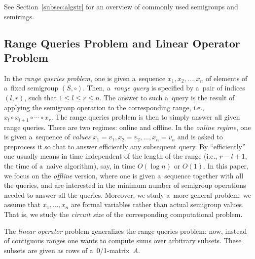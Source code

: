 \documentclass{toc}
\begin{document}
See Section~\ref{subsec:algstr} for an overview of commonly used semigroups and
semirings.



\subsection{Range Queries Problem and Linear Operator Problem}
In the {\em range queries problem}, one is given
a~sequence $x_1, x_2, \dotsc, x_n$ of
elements of a~fixed semigroup $(S, \circ)$.
Then, a~\emph{range query} is
specified by a~pair of indices $(l,r)$, such that $1 \le l \le r \le n$.
The answer to such a~query is the result of applying the semigroup
operation to the
corresponding range, i.e., $x_l \circ x_{l+1} \circ \dotsb \circ x_r$.
The range queries problem is then to simply answer all given range
queries.
There are two
regimes: online and offline. In the {\em online regime}, one is given
a~sequence of {\em values}
$x_1=v_1, x_2=v_2, \dotsc, x_n=v_n$ and is asked to preprocess
it so that to
answer efficiently any subsequent query.
By ``efficiently'' one usually
means in time independent of the length of the range
(i.e., $r-l+1$, the time
of a~naive algorithm), say, in time $O(\log n)$ or $O(1)$.
In this paper, we
focus on the {\em offline} version, where one is given a~sequence
together with
all the queries, and are interested in the minimum number of
semigroup
operations needed to answer all the queries. Moreover, we study
a~more general
problem: we assume that $x_1, \dotsc, x_n$ are formal variables
rather than
actual semigroup values. That is, we study the {\em circuit size} of
the corresponding
computational problem.

The {\em linear operator} problem generalizes the range
queries problem: now, instead of contiguous ranges one wants
to compute sums over arbitrary subsets. These subsets are
given as rows of a~0/1-matrix~$A$.
\end{document}
